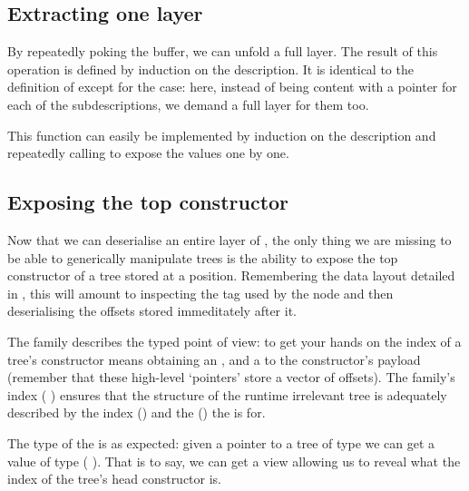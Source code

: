 \subsection{Extracting one layer}

By repeatedly poking the buffer, we can unfold a full layer.
The result of this operation is defined by induction
on the description. It is identical to the definition of
 except for the  case:
here, instead of being content with a pointer for each of the
subdescriptions, we demand a full layer for them too.


This function can easily be implemented by induction on the description
and repeatedly calling  to expose the values one by
one.


\subsection{Exposing the top constructor}

Now that we can deserialise an entire layer of ,
the only thing we are missing to be able to generically manipulate trees
is the ability to expose the top constructor of a tree stored at a
 position.
%
Remembering the data layout detailed in , this will
amount to inspecting the tag used by the node and then deserialising the
offsets stored immeditately after it.

The  family describes the typed point of view:
to get your hands on the index of a tree's constructor means
obtaining an ,
and a  to the constructor's payload
(remember that these high-level `pointers' store a vector of offsets).
%
The family's index ( \IdrisData{\#} )
ensures that the structure of the runtime irrelevant
tree is adequately described by
the index () and
the  () the  is for.


The type of the  is as expected: given a pointer
to a tree  of type  we can get a value
of type (  ).
%
That is to say, we can get a view allowing us to reveal what the
index of the tree's head constructor is.

